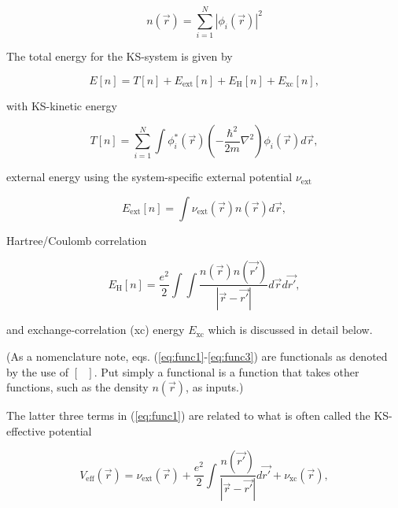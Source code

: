         \begin{equation}
            n(\Vec{r}) = \sum\limits_{i=1}^N |\phi_i(\Vec{r}) |^2
        \end{equation}
        
        The total energy for the KS-system is given by
        
        \begin{equation}
        \label{eq:func1}
            E[n] = T[n] + E_\text{ext}[n] + E_\text{H}[n] + E_\text{xc}[n],
        \end{equation}
        
        \noindent with KS-kinetic energy
        
        \begin{equation}
        \label{eq:func2}
            T[n] = \sum\limits_{i=1}^N \int \phi_i^*(\Vec{r})\left(-\frac{\hbar^2}{2m}\nabla^2 \right)\phi_i(\Vec{r})d\Vec{r},
        \end{equation}
        
        \noindent external energy using the system-specific external potential $\nu_\text{ext}$
        
        \begin{equation}
            E_\text{ext}[n] = \int \nu_\text{ext}(\Vec{r}) n(\Vec{r})d\Vec{r},
        \end{equation}
        
        \noindent Hartree/Coulomb correlation 
        
        \begin{equation}
        \label{eq:func3}
            E_\text{H}[n] = \frac{e^2}{2}\int\int \frac{n(\Vec{r})n(\Vec{r'})}{|\Vec{r} - \Vec{r'}|}d\Vec{r}d\Vec{r'}, 
        \end{equation}
        
        \noindent and exchange-correlation (xc) energy $E_\text{xc}$ which is discussed in detail below. 
        
        (As a nomenclature note, eqs. (\ref{eq:func1}-\ref{eq:func3}) are functionals as denoted by the use of $[\text{ }]$. Put simply a functional is a function that takes other functions, such as the density $n(\Vec{r})$, as inputs.)
        
        The latter three terms in (\ref{eq:func1}) are related to what is often called the KS-effective potential
        
        \begin{equation}
            V_\text{eff}(\Vec{r}) = \nu_\text{ext}(\Vec{r}) + \frac{e^2}{2}\int \frac{n(\Vec{r'})}{|\Vec{r}- \Vec{r'}|} d\Vec{r'} + \nu_\text{xc}(\Vec{r}),
        \end{equation}
        
